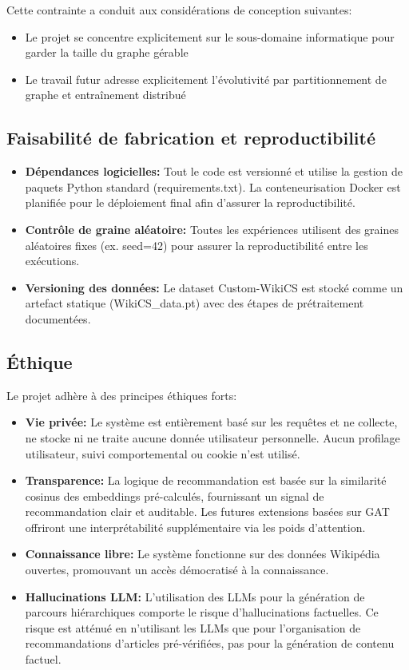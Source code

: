 Cette contrainte a conduit aux considérations de conception suivantes:
\begin{itemize}
    \item Le projet se concentre explicitement sur le sous-domaine informatique pour garder la taille du graphe gérable
    \item Le travail futur adresse explicitement l'évolutivité par partitionnement de graphe et entraînement distribué
\end{itemize}

\subsection{Faisabilité de fabrication et reproductibilité}

\begin{itemize}
    \item \textbf{Dépendances logicielles:} Tout le code est versionné et utilise la gestion de paquets Python standard (requirements.txt). La conteneurisation Docker est planifiée pour le déploiement final afin d'assurer la reproductibilité.
    \item \textbf{Contrôle de graine aléatoire:} Toutes les expériences utilisent des graines aléatoires fixes (ex. seed=42) pour assurer la reproductibilité entre les exécutions.
    \item \textbf{Versioning des données:} Le dataset Custom-WikiCS est stocké comme un artefact statique (WikiCS\_data.pt) avec des étapes de prétraitement documentées.
\end{itemize}

\subsection{Éthique}

Le projet adhère à des principes éthiques forts:

\begin{itemize}
    \item \textbf{Vie privée:} Le système est entièrement basé sur les requêtes et ne collecte, ne stocke ni ne traite aucune donnée utilisateur personnelle. Aucun profilage utilisateur, suivi comportemental ou cookie n'est utilisé.
    \item \textbf{Transparence:} La logique de recommandation est basée sur la similarité cosinus des embeddings pré-calculés, fournissant un signal de recommandation clair et auditable. Les futures extensions basées sur GAT offriront une interprétabilité supplémentaire via les poids d'attention.
    \item \textbf{Connaissance libre:} Le système fonctionne sur des données Wikipédia ouvertes, promouvant un accès démocratisé à la connaissance.
    \item \textbf{Hallucinations LLM:} L'utilisation des LLMs pour la génération de parcours hiérarchiques comporte le risque d'hallucinations factuelles. Ce risque est atténué en n'utilisant les LLMs que pour l'organisation de recommandations d'articles pré-vérifiées, pas pour la génération de contenu factuel.
\end{itemize}

